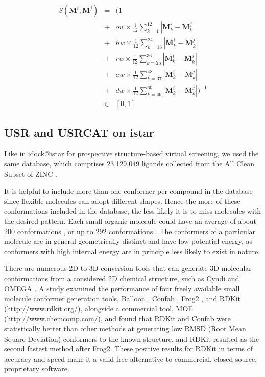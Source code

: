 \documentclass[a4,center,fleqn]{NAR}
\begin{document}
\begin{eqnarray}
S(\mathbf M^i, \mathbf M^j)&=&(1\nonumber\\
&+&ow\times\frac{1}{12}\sum_{k= 1}^{12}|\mathbf M_k^i-\mathbf M_k^j|\nonumber\\
&+&hw\times\frac{1}{12}\sum_{k=13}^{24}|\mathbf M_k^i-\mathbf M_k^j|\nonumber\\
&+&rw\times\frac{1}{12}\sum_{k=25}^{36}|\mathbf M_k^i-\mathbf M_k^j|\nonumber\\
&+&aw\times\frac{1}{12}\sum_{k=37}^{48}|\mathbf M_k^i-\mathbf M_k^j|\nonumber\\
&+&dw\times\frac{1}{12}\sum_{k=49}^{60}|\mathbf M_k^i-\mathbf M_k^j|)^{-1}\nonumber\\
&\in&[0, 1]
\label{usrcatscore}
\end{eqnarray}

\subsection{USR and USRCAT on istar}

Like in idock@istar for prospective structure-based virtual screening, we used the same database, which comprises 23,129,049 ligands collected from the All Clean Subset of ZINC \cite{532,1178}.

It is helpful to include more than one conformer per compound in the database since flexible molecules can adopt different shapes. Hence the more of these conformations included in the database, the less likely it is to miss molecules with the desired pattern. Each small organic molecule could have an average of about 200 conformations \cite{1332}, or up to 292 conformations \cite{1280}. The conformers of a particular molecule are in general geometrically distinct and have low potential energy, as conformers with high internal energy are in principle less likely to exist in nature.

There are numerous 2D-to-3D conversion tools that can generate 3D molecular conformations from a considered 2D chemical structure, such as Cyndi \cite{1393,1394} and OMEGA \cite{462}. A study \cite{1127} examined the performance of four freely available small molecule conformer generation tools, Balloon \cite{1442}, Confab \cite{1443}, Frog2 \cite{1444}, and RDKit (http://www.rdkit.org/), alongside a commercial tool, MOE (http://www.chemcomp.com/), and found that RDKit and Confab were statistically better than other methods at generating low RMSD (Root Mean Square Deviation) conformers to the known structure, and RDKit resulted as the second fastest method after Frog2. These positive results for RDKit in terms of accuracy and speed make it a valid free alternative to commercial, closed source, proprietary software.
\end{document}
